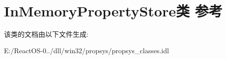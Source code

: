 \hypertarget{class_in_memory_property_store}{}\section{In\+Memory\+Property\+Store类 参考}
\label{class_in_memory_property_store}


该类的文档由以下文件生成\+:\begin{DoxyCompactItemize}
\item 
E\+:/\+React\+O\+S-\/0../dll/win32/propsys/propsys\+\_\+classes.\+idl\end{DoxyCompactItemize}
